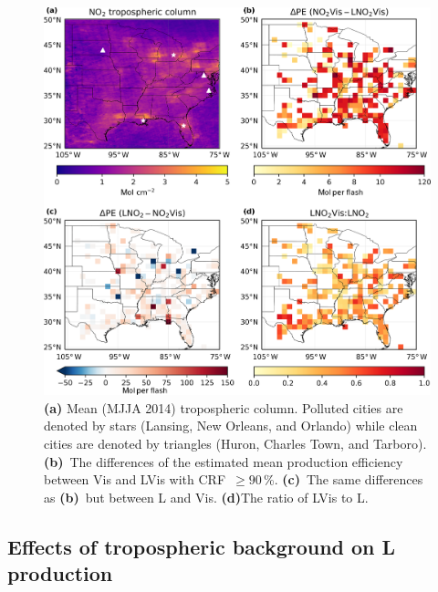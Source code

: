 \documentclass[amt]{copernicus}
\begin{document}
\begin{figure}[t]
    \includegraphics[width=12cm]{amt-2019-372-f06.png}
    \caption{\textbf{(a)} Mean (MJJA 2014)  tropospheric column.
        Polluted cities are denoted by stars (Lansing, New Orleans, and Orlando) while clean cities are denoted by triangles (Huron, Charles Town, and Tarboro).
        \textbf{(b)}~The differences of the estimated mean production efficiency between Vis and LVis with CRF~$\geq 90$\,{\%}.
        \textbf{(c)}~The same differences as \textbf{(b)}~but between L and Vis.
        \textbf{(d)}The ratio of LVis to L.}
    \label{fig:delta}
\end{figure}

\subsection{Effects of tropospheric background on L production}
\label{section:Effectsofbackground}
\end{document}
